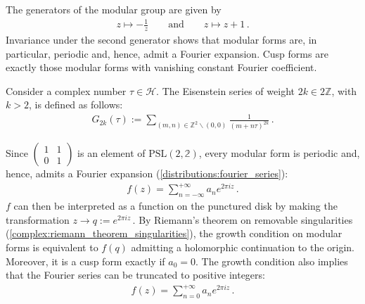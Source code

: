     \begin{property}
        The generators of the modular group are given by
        \begin{gather}
            z\mapsto-\frac{1}{z}\qquad\text{and}\qquad z\mapsto z+1\,.
        \end{gather}
        Invariance under the second generator shows that modular forms are, in particular, periodic and, hence, admit a Fourier expansion. Cusp forms are exactly those modular forms with vanishing constant Fourier coefficient.
    \end{property}

    \begin{example}
        Consider a complex number $\tau\in\mathcal{H}$. The Eisenstein series of weight $2k\in2\mathbb{Z}$, with $k>2$, is defined as follows:
        \begin{gather}
            G_{2k}(\tau) := \sum_{(m,n)\in\mathbb{Z}^2\backslash(0,0)}\frac{1}{(m+n\tau)^{2k}}\,.
        \end{gather}
    \end{example}

    \begin{remark}
        Since $\begin{pmatrix}1&1\\0&1\end{pmatrix}$ is an element of $\mathrm{PSL}(2,\mathbb{2})$, every modular form is periodic and, hence, admits a Fourier expansion (\cref{distributions:fourier_series}):
        \begin{gather}
            f(z) = \sum_{n=-\infty}^{+\infty}a_ne^{2\pi iz}\,.
        \end{gather}
        $f$ can then be interpreted as a function on the punctured disk by making the transformation $z\longrightarrow q:=e^{2\pi iz}$\,. By Riemann's theorem on removable singularities (\cref{complex:riemann_theorem_singularities}), the growth condition on modular forms is equivalent to $f(q)$ admitting a holomorphic continuation to the origin. Moreover, it is a cusp form exactly if $a_0=0$. The growth condition also implies that the Fourier series can be truncated to positive integers:
        \begin{gather}
            f(z) = \sum_{n=0}^{+\infty}a_ne^{2\pi iz}\,.
        \end{gather}
    \end{remark}

